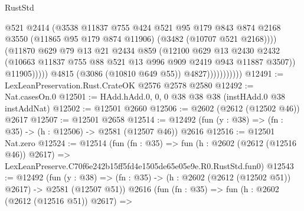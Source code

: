 \begin{lexlean}{RustStd}
\begin{coremodule}
                                    @521
                                    @2414
                                    (@3538
                                      @11837
                                      @755
                                      @424
                                      @521
                                      @95
                                      @179
                                      @843
                                      @874
                                      @2168
                                      @3550
                                      (@11865 @95 @179 @874 @11906)
                                      (@3482 (@10707 @521 @2168))))
                                  (@11870
                                    @629
                                    @79
                                    @13
                                    @21
                                    @2434
                                    @859
                                    (@12100
                                      @629
                                      @13
                                      @2430
                                      @2432
                                      (@10663
                                        @11837
                                        @755
                                        @88
                                        @521
                                        @13
                                        @996
                                        @909
                                        @2419
                                        @943
                                        @11887
                                        @3507))
                                    @11905)))))
                          @4815
                          (@3086 (@10810 @649 @55))
                          @4827)))))))))))
@12491 := LexLeanPreservation.Rust.CrateOK @2576 @2578 @2580
@12492 := Nat.casesOn.{0}
@12501 := HAdd.hAdd.{0, 0, 0} @38 @38 @38 (instHAdd.{0} @38 instAddNat)
@12502 := @12501 @2660
@12506 := @2602 (@2612 (@12502 @46)) @2617
@12507 := @12501 @2658
@12514 := @12492 (fun (y : @38) => (fn : @35) -> (h : @12506) -> @2581 (@12507 @46)) @2616
@12516 := @12501 Nat.zero
@12524 := @12514
    (fun (fn : @35) =>
    fun (h : @2602 (@2612 (@12516 @46)) @2617) =>
    LexLeanPreserve.C70f6e242b15ff5fd4e1505de65e05e9e.R0.RustStd.fun0)
@12543 := @12492
    (fun (y : @38) => (fn : @35) -> (h : @2602 (@2612 (@12502 @51)) @2617) -> @2581 (@12507 @51))
    @2616
    (fun (fn : @35) =>
    fun (h : @2602 (@2612 (@12516 @51)) @2617) =>

\end{coremodule}
\end{lexlean}
